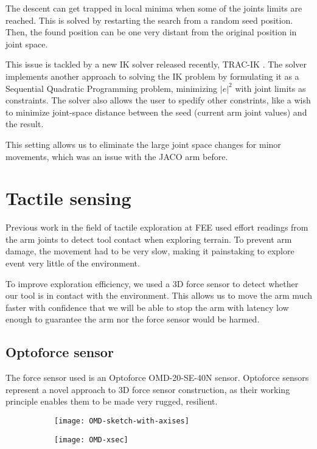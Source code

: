 \documentclass[buriama8_dp.tex]{subfiles}
\begin{document}
The descent can get trapped in local minima when some of the joints limits are reached. This is solved by restarting the search from a random seed position. Then, the found position can be one very distant from the original position in joint space.

This issue is tackled by a new IK solver released recently, TRAC-IK \cite{tracik}. The solver implements another approach to solving the IK problem by formulating it as a Sequential Quadratic Programming problem, minimizing \(|e|^2\) with joint limits as constraints. The solver also allows the user to spedify other constrints, like a wish to minimize joint-space distance between the seed (current arm joint values) and the result.

This setting allows us to eliminate the large joint space changes for minor movements, which was an issue with the JACO arm before.

\section{Tactile sensing}

Previous work in the field of tactile exploration at FEE \cite{vojta} used effort readings from the arm joints to detect tool contact when exploring terrain. To prevent arm damage, the movement had to be very slow, making it painstaking to explore event very little of the environment.

To improve exploration efficiency, we used a 3D force sensor to detect whether our tool is in contact with the environment. This allows us to move the arm much faster with confidence that we will be able to stop the arm with latency low enough to guarantee the arm nor the force sensor would be harmed.

\subsection{Optoforce sensor}
\label{subsec:opto}

The force sensor used is an Optoforce OMD-20-SE-40N sensor. Optoforce sensors represent a novel approach to 3D force sensor construction, as their working principle enables them to be made very rugged, resilient.


\begin{figure}[ht]
  \begin{subfigure}[t]{0.4\textwidth}
    \texttt{[image: OMD-sketch-with-axises]}
    \caption{}
    \label{fig:omd_geom}
  \end{subfigure}
  \begin{subfigure}[t]{0.4\textwidth}
    \texttt{[image: OMD-xsec]}
    \caption{}
    \label{fig:omd_xsec}
  \end{subfigure}

  \caption[Optoforce sensor]{}
  \label{fig:decomps}
\end{figure}
\end{document}
